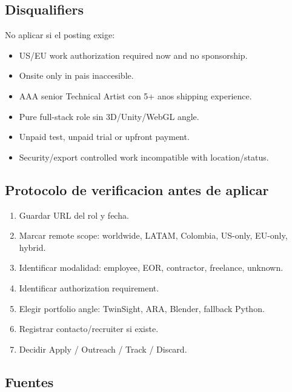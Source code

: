 \subsection{Disqualifiers}


No aplicar si el posting exige:


\begin{itemize}
\item US/EU work authorization required now and no sponsorship.
\item Onsite only in pais inaccesible.
\item AAA senior Technical Artist con 5+ anos shipping experience.
\item Pure full-stack role sin 3D/Unity/WebGL angle.
\item Unpaid test, unpaid trial or upfront payment.
\item Security/export controlled work incompatible with location/status.
\end{itemize}


\subsection{Protocolo de verificacion antes de aplicar}


\begin{enumerate}
\item Guardar URL del rol y fecha.
\item Marcar remote scope: worldwide, LATAM, Colombia, US-only, EU-only, hybrid.
\item Identificar modalidad: employee, EOR, contractor, freelance, unknown.
\item Identificar authorization requirement.
\item Elegir portfolio angle: TwinSight, ARA, Blender, fallback Python.
\item Registrar contacto/recruiter si existe.
\item Decidir Apply / Outreach / Track / Discard.
\end{enumerate}


\subsection{Fuentes}


